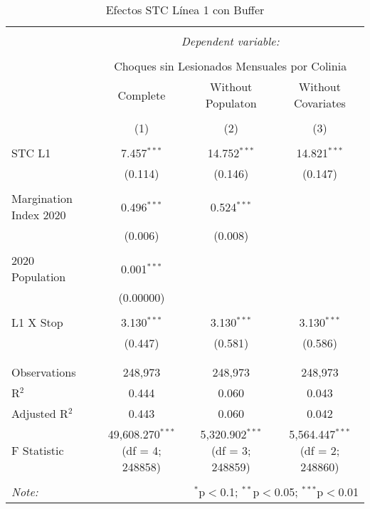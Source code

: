 
\begin{table}[!htbp] \centering 
  \caption{Efectos STC Línea 1 con Buffer} 
  \label{} 
\begin{tabular}{@{\extracolsep{5pt}}lccc} 
\\[-1.8ex]\hline 
\hline \\[-1.8ex] 
 & \multicolumn{3}{c}{\textit{Dependent variable:}} \\ 
\cline{2-4} 
\\[-1.8ex] & \multicolumn{3}{c}{Choques sin Lesionados Mensuales por Colinia} \\ 
 & Complete & Without Populaton & Without Covariates \\ 
\\[-1.8ex] & (1) & (2) & (3)\\ 
\hline \\[-1.8ex] 
 STC L1 & 7.457$^{***}$ & 14.752$^{***}$ & 14.821$^{***}$ \\ 
  & (0.114) & (0.146) & (0.147) \\ 
  & & & \\ 
 Margination Index 2020 & 0.496$^{***}$ & 0.524$^{***}$ &  \\ 
  & (0.006) & (0.008) &  \\ 
  & & & \\ 
 2020 Population & 0.001$^{***}$ &  &  \\ 
  & (0.00000) &  &  \\ 
  & & & \\ 
 L1 X Stop & 3.130$^{***}$ & 3.130$^{***}$ & 3.130$^{***}$ \\ 
  & (0.447) & (0.581) & (0.586) \\ 
  & & & \\ 
\hline \\[-1.8ex] 
Observations & 248,973 & 248,973 & 248,973 \\ 
R$^{2}$ & 0.444 & 0.060 & 0.043 \\ 
Adjusted R$^{2}$ & 0.443 & 0.060 & 0.042 \\ 
F Statistic & 49,608.270$^{***}$ (df = 4; 248858) & 5,320.902$^{***}$ (df = 3; 248859) & 5,564.447$^{***}$ (df = 2; 248860) \\ 
\hline 
\hline \\[-1.8ex] 
\textit{Note:}  & \multicolumn{3}{r}{$^{*}$p$<$0.1; $^{**}$p$<$0.05; $^{***}$p$<$0.01} \\ 
\end{tabular} 
\end{table} 
